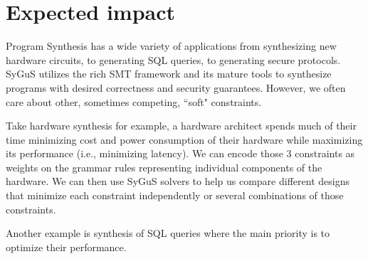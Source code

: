 \section{Expected impact}
\label{sec:impact}
Program Synthesis has a wide variety of applications from synthesizing new hardware circuits, to generating SQL queries, to generating secure protocols.
%
SyGuS utilizes the rich SMT framework and its mature tools to synthesize programs with desired correctness and security guarantees.
%
However, we often care about other, sometimes competing, ``soft" constraints.
%

Take hardware synthesis for example, a hardware architect spends much of their time minimizing cost and power consumption of their hardware while maximizing its performance (i.e., minimizing latency).
%
We can encode those 3 constraints as weights on the grammar rules representing individual components of the hardware.
%
We can then use SyGuS solvers to help us compare different designs that minimize each constraint independently or several combinations of those constraints.
%

Another example is synthesis of SQL queries where the main priority is to optimize their performance.



%
%
%
%

